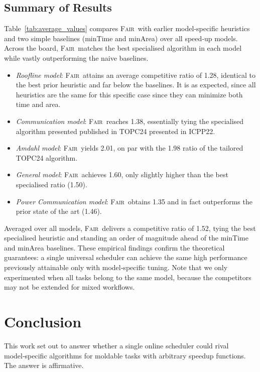 \documentclass{article}
\newcommand\fair{\textsc{Fair}\xspace}
\begin{document}
\subsection{Summary of Results}
\label{sec.expresults}

Table~\ref{tab:average_values} compares \fair\ with earlier model‑specific heuristics and two simple baselines (minTime and minArea) over all speed‑up models.  
Across the board, \fair\ matches the best specialised algorithm in each model while vastly outperforming the naive baselines.

\begin{itemize}
\item \textit{Roofline model}: \fair\ attains an average competitive ratio of 1.28, identical to the best prior heuristic and far below the baselines.  It is as expected, since all heuristics are the same for this specific case since they can minimize both time and area. 
\item \textit{Communication model}: \fair\ reaches 1.38, essentially tying the specialised algorithm presented published in TOPC24 presented in ICPP22.  
\item \textit{Amdahl model}: \fair\ yields 2.01, on par with the 1.98 ratio of the tailored TOPC24 algorithm.  
\item \textit{General model}: \fair\ achieves 1.60, only slightly higher than the best specialised ratio (1.50).  
\item \textit{Power Communication model}: \fair\ obtains 1.35 and in fact outperforms the prior state of the art (1.46).  
\end{itemize}

Averaged over all models, \fair\ delivers a competitive ratio of 1.52, tying the best specialised heuristic and standing an order of magnitude ahead of the minTime and minArea baselines.  
These empirical findings confirm the theoretical guarantees: a single universal scheduler can achieve the same high performance previously attainable only with model‑specific tuning. Note that we only experimented when all tasks belong to the same model, because the competitors may not be extended for mixed workflows.


\section{Conclusion}
\label{sec.conclusion}

This work set out to answer whether a single online scheduler could rival model‑specific algorithms for moldable tasks with arbitrary speedup functions.  
The answer is affirmative.  
\end{document}
